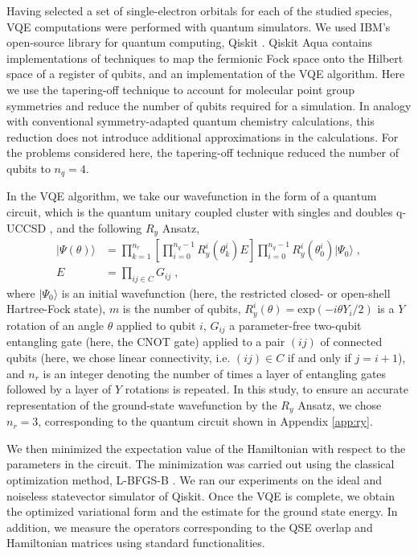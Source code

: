 \documentclass[aps,pra,twocolumn]{revtex4-2}
\begin{document}
Having selected a set of single-electron orbitals for each of the studied species, VQE computations were performed with quantum simulators.
We used IBM's open-source library for quantum computing, Qiskit \cite{aleksandrowicz2019qiskit}.
Qiskit Aqua contains implementations of techniques to map the fermionic Fock space onto the Hilbert space of a register of qubits, and an implementation of the VQE algorithm.
Here we use the tapering-off technique \cite{bravyi2017tapering,setia2019reducing} to account for molecular point group symmetries and reduce the number of qubits required for a simulation. 
In analogy with conventional symmetry-adapted quantum chemistry calculations, this reduction does not introduce additional approximations in the calculations.
For the problems considered here, the tapering-off technique reduced the number of qubits to $n_q=4$.

In the VQE algorithm, we take our wavefunction in the form of a quantum circuit, which is the quantum unitary coupled cluster with singles 
and doubles q-UCCSD \cite{barkoutsos2018quantum}, and the following $R_y$ Ansatz,
\begin{equation}
\begin{split}
| \Psi(\theta) \rangle &= 
\prod_{k=1}^{n_r}
\left[
\prod_{i=0}^{n_q-1} R^{i}_{y}(\theta_{k}^i)
E
\right]
\prod_{i=0}^{n_q-1} R^{i}_{y}(\theta_{0}^i) | \Psi_0 \rangle
\;, \\
E &= \prod_{ij\in C} G_{ij} \;,
\end{split}
\end{equation}
where $| \Psi_0 \rangle$ is an initial wavefunction (here, the restricted closed- or open-shell Hartree-Fock state), $m$ is the number of qubits, $R^i_{y}(\theta) 
= \mbox{exp}(-i \theta Y_i/2)$ is a $Y$ rotation of an angle $\theta$ applied to qubit $i$, $G_{ij}$ a parameter-free two-qubit entangling gate (here, the CNOT gate) 
applied to a pair $(ij)$ of connected qubits (here, we chose linear connectivity, i.e. $(ij) \in C$ if and only if $j=i+1$),
and $n_r$ is an integer denoting the number of times a layer of entangling gates followed by a layer of $Y$ rotations is repeated. 
In this study, to ensure an accurate representation of the ground-state wavefunction by the $R_y$ Ansatz, we chose $n_r = 3$, corresponding to the quantum circuit shown in Appendix \ref{app:ry}.

We then minimized the expectation value of the Hamiltonian with respect to the parameters in the circuit. 
The minimization was carried out using the classical optimization method, L-BFGS-B \cite{zhu1997algorithm,morales2011remark}. 
We ran our experiments on the ideal and noiseless statevector simulator of Qiskit.
Once the VQE is complete, we obtain the optimized variational form and the estimate for the ground state energy. 
In addition, we measure the operators corresponding to the QSE overlap and Hamiltonian matrices using standard functionalities.
\end{document}

